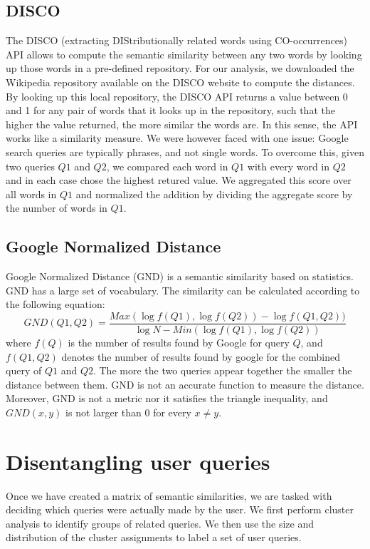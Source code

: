\documentclass[11pt]{article}
\begin{document}
\begin{multicols}{2}
\subsection{DISCO}
\label{sec:disco}
The DISCO (extracting DIStributionally related words using CO-occurrences) API allows to compute the semantic similarity between any two words by looking up those words in a pre-defined repository. For our analysis, we downloaded the Wikipedia repository available on the DISCO website to compute the distances. By looking up this local repository, the DISCO API returns a value between 0 and 1 for any pair of words that it looks up in the repository, such that the higher the value returned, the more similar the words are. In this sense, the API works like a similarity measure. We were however faced with one issue: Google search queries are typically phrases, and not single words. To overcome this, given two queries $Q1$ and $Q2$, we compared each word in $Q1$ with every word in $Q2$ and in each case chose the highest retured value. We aggregated this score over all words in $Q1$ and normalized the addition by dividing the aggregate score by the number of words in $Q1$.

\subsection{Google Normalized Distance}
\label{sec:gnd}
Google Normalized Distance (GND) is a semantic similarity based on statistics. GND has a large set of vocabulary. The similarity can be calculated according to the following equation:
\begin{equation}
\label{eq:gnd}
GND(Q1, Q2) = \frac{Max(\log f(Q1), \log f(Q2))-\log f(Q1, Q2))}{\log N - Min(\log f(Q1), \log f(Q2))}
\end{equation} 
where $f(Q)$ is the number of results found by Google for query $Q$, and $f(Q1, Q2)$ denotes the number of results found by google for the combined query of $Q1$ and $Q2$.
The more the two queries appear together the smaller the distance between them. GND is not an accurate function to measure the distance\cite{DBLP:GND}. Moreover, GND is not a metric nor it satisfies the triangle inequality, and $GND(x, y)$ is not larger than 0 for every $x \neq y$. 



\section{Disentangling user queries}
\label{sec:disentangle}
Once we have created a matrix of semantic similarities, we are tasked
with deciding which queries were actually made by the user. We first
perform cluster analysis to identify groups of related queries. We
then use the size and distribution of the cluster assignments to label a
set of user queries.


\end{multicols}
\end{document}
